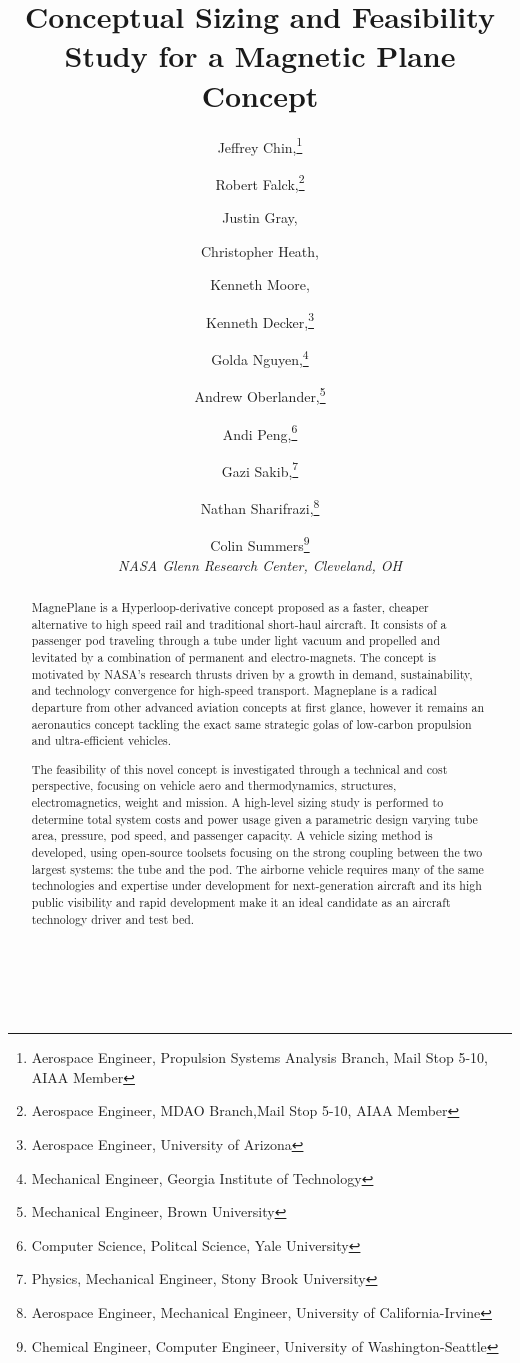 \documentclass[]             %
{aiaa-tc}                       %
\title{Conceptual Sizing and Feasibility Study for a Magnetic Plane Concept}
\author{
  Jeffrey Chin,\thanks{Aerospace Engineer, Propulsion Systems Analysis Branch, Mail Stop 5-10, AIAA Member}
  \and Robert Falck,\thanks{Aerospace Engineer, MDAO Branch,Mail Stop 5-10, AIAA Member}
  \and Justin Gray,\thanksibid{2}
  \and Christopher Heath,\thanksibid{2}
  \and Kenneth Moore,\thanksibid{2}
  \and Kenneth Decker,\thanks{Aerospace Engineer, University of Arizona}
  \and Golda Nguyen,\thanks{Mechanical Engineer, Georgia Institute of Technology}
  \and Andrew Oberlander,\thanks{Mechanical Engineer, Brown University}
  \and Andi Peng,\thanks{Computer Science, Politcal Science, Yale University}
  \and Gazi Sakib,\thanks{Physics, Mechanical Engineer, Stony Brook University}
  \and Nathan Sharifrazi,\thanks{Aerospace Engineer, Mechanical Engineer, University of California-Irvine}
  \and Colin Summers\thanks{Chemical Engineer, Computer Engineer, University of Washington-Seattle}
  \\
  {\normalsize\itshape
  NASA Glenn Research Center, Cleveland, OH}
}
\begin{document}
\maketitle

\begin{abstract}
MagnePlane is a Hyperloop-derivative concept proposed as a faster,
cheaper alternative to high speed rail and traditional short-haul aircraft.
It consists of a passenger pod traveling through a tube under light vacuum and
propelled and levitated by a combination of permanent and electro-magnets.
The concept is motivated by NASA's research thrusts driven by a growth in
demand, sustainability, and technology convergence for high-speed transport.
Magneplane is a radical departure from other advanced aviation concepts at
first glance, however it remains an aeronautics concept tackling the exact
same strategic golas of low-carbon propulsion and ultra-efficient vehicles.

The feasibility of this novel concept is investigated through a technical
and cost perspective, focusing on vehicle aero and thermodynamics, structures,
electromagnetics, weight and mission.
A high-level sizing study is performed to determine total system costs and
power usage given a parametric design varying tube area,
pressure, pod speed, and passenger capacity.
A vehicle sizing method is developed, using open-source toolsets focusing on
the strong coupling between the two largest systems: the tube and the pod.
The airborne vehicle requires many of the same technologies and expertise
under development for next-generation aircraft and its high public visibility
and rapid development make it an ideal candidate as an aircraft
technology driver and test bed.
\\
\\
\\
\\

\end{abstract}

\setcounter{secnumdepth}{1}
\setcounter{tocdepth}{1}
\printnomenclature






\end{document}
